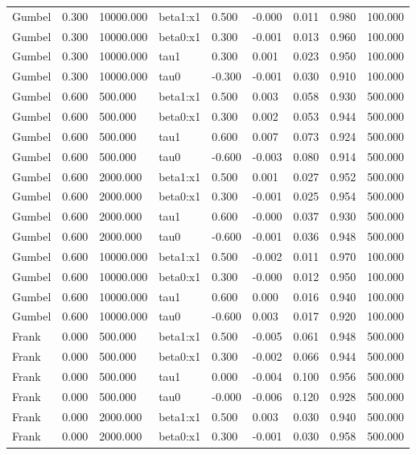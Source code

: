 \begin{table}[htbp]
\begin{tabular}{lllllllll}
Gumbel & 0.300 & 10000.000 & beta1:x1 & 0.500 & -0.000 & 0.011 & 0.980 & 100.000 \\
Gumbel & 0.300 & 10000.000 & beta0:x1 & 0.300 & -0.001 & 0.013 & 0.960 & 100.000 \\
Gumbel & 0.300 & 10000.000 & tau1 & 0.300 & 0.001 & 0.023 & 0.950 & 100.000 \\
Gumbel & 0.300 & 10000.000 & tau0 & -0.300 & -0.001 & 0.030 & 0.910 & 100.000 \\
Gumbel & 0.600 & 500.000 & beta1:x1 & 0.500 & 0.003 & 0.058 & 0.930 & 500.000 \\
Gumbel & 0.600 & 500.000 & beta0:x1 & 0.300 & 0.002 & 0.053 & 0.944 & 500.000 \\
Gumbel & 0.600 & 500.000 & tau1 & 0.600 & 0.007 & 0.073 & 0.924 & 500.000 \\
Gumbel & 0.600 & 500.000 & tau0 & -0.600 & -0.003 & 0.080 & 0.914 & 500.000 \\
Gumbel & 0.600 & 2000.000 & beta1:x1 & 0.500 & 0.001 & 0.027 & 0.952 & 500.000 \\
Gumbel & 0.600 & 2000.000 & beta0:x1 & 0.300 & -0.001 & 0.025 & 0.954 & 500.000 \\
Gumbel & 0.600 & 2000.000 & tau1 & 0.600 & -0.000 & 0.037 & 0.930 & 500.000 \\
Gumbel & 0.600 & 2000.000 & tau0 & -0.600 & -0.001 & 0.036 & 0.948 & 500.000 \\
Gumbel & 0.600 & 10000.000 & beta1:x1 & 0.500 & -0.002 & 0.011 & 0.970 & 100.000 \\
Gumbel & 0.600 & 10000.000 & beta0:x1 & 0.300 & -0.000 & 0.012 & 0.950 & 100.000 \\
Gumbel & 0.600 & 10000.000 & tau1 & 0.600 & 0.000 & 0.016 & 0.940 & 100.000 \\
Gumbel & 0.600 & 10000.000 & tau0 & -0.600 & 0.003 & 0.017 & 0.920 & 100.000 \\
Frank & 0.000 & 500.000 & beta1:x1 & 0.500 & -0.005 & 0.061 & 0.948 & 500.000 \\
Frank & 0.000 & 500.000 & beta0:x1 & 0.300 & -0.002 & 0.066 & 0.944 & 500.000 \\
Frank & 0.000 & 500.000 & tau1 & 0.000 & -0.004 & 0.100 & 0.956 & 500.000 \\
Frank & 0.000 & 500.000 & tau0 & -0.000 & -0.006 & 0.120 & 0.928 & 500.000 \\
Frank & 0.000 & 2000.000 & beta1:x1 & 0.500 & 0.003 & 0.030 & 0.940 & 500.000 \\
Frank & 0.000 & 2000.000 & beta0:x1 & 0.300 & -0.001 & 0.030 & 0.958 & 500.000 \\

\end{tabular}
\end{table}
